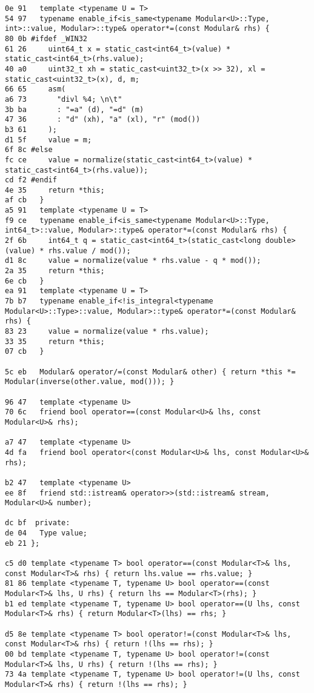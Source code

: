 \documentclass[11pt, a4paper, twoside]{article}
\begin{document}
\begin{lstlisting}
0e 91   template <typename U = T>
54 97   typename enable_if<is_same<typename Modular<U>::Type, int>::value, Modular>::type& operator*=(const Modular& rhs) {
80 0b #ifdef _WIN32
61 26     uint64_t x = static_cast<int64_t>(value) * static_cast<int64_t>(rhs.value);
40 a0     uint32_t xh = static_cast<uint32_t>(x >> 32), xl = static_cast<uint32_t>(x), d, m;
66 65     asm(
a6 73       "divl %4; \n\t"
3b ba       : "=a" (d), "=d" (m)
47 36       : "d" (xh), "a" (xl), "r" (mod())
b3 61     );
d1 5f     value = m;
6f 8c #else
fc ce     value = normalize(static_cast<int64_t>(value) * static_cast<int64_t>(rhs.value));
cd f2 #endif
4e 35     return *this;
af cb   }
a5 91   template <typename U = T>
f9 ce   typename enable_if<is_same<typename Modular<U>::Type, int64_t>::value, Modular>::type& operator*=(const Modular& rhs) {
2f 6b     int64_t q = static_cast<int64_t>(static_cast<long double>(value) * rhs.value / mod());
d1 8c     value = normalize(value * rhs.value - q * mod());
2a 35     return *this;
6e cb   }
ea 91   template <typename U = T>
7b b7   typename enable_if<!is_integral<typename Modular<U>::Type>::value, Modular>::type& operator*=(const Modular& rhs) {
83 23     value = normalize(value * rhs.value);
33 35     return *this;
07 cb   }
      
5c eb   Modular& operator/=(const Modular& other) { return *this *= Modular(inverse(other.value, mod())); }
      
96 47   template <typename U>
70 6c   friend bool operator==(const Modular<U>& lhs, const Modular<U>& rhs);
      
a7 47   template <typename U>
4d fa   friend bool operator<(const Modular<U>& lhs, const Modular<U>& rhs);
      
b2 47   template <typename U>
ee 8f   friend std::istream& operator>>(std::istream& stream, Modular<U>& number);
      
dc bf  private:
de 04   Type value;
eb 21 };

c5 d0 template <typename T> bool operator==(const Modular<T>& lhs, const Modular<T>& rhs) { return lhs.value == rhs.value; }
81 86 template <typename T, typename U> bool operator==(const Modular<T>& lhs, U rhs) { return lhs == Modular<T>(rhs); }
b1 ed template <typename T, typename U> bool operator==(U lhs, const Modular<T>& rhs) { return Modular<T>(lhs) == rhs; }

d5 8e template <typename T> bool operator!=(const Modular<T>& lhs, const Modular<T>& rhs) { return !(lhs == rhs); }
00 bd template <typename T, typename U> bool operator!=(const Modular<T>& lhs, U rhs) { return !(lhs == rhs); }
73 4a template <typename T, typename U> bool operator!=(U lhs, const Modular<T>& rhs) { return !(lhs == rhs); }


\end{lstlisting}
\end{document}
